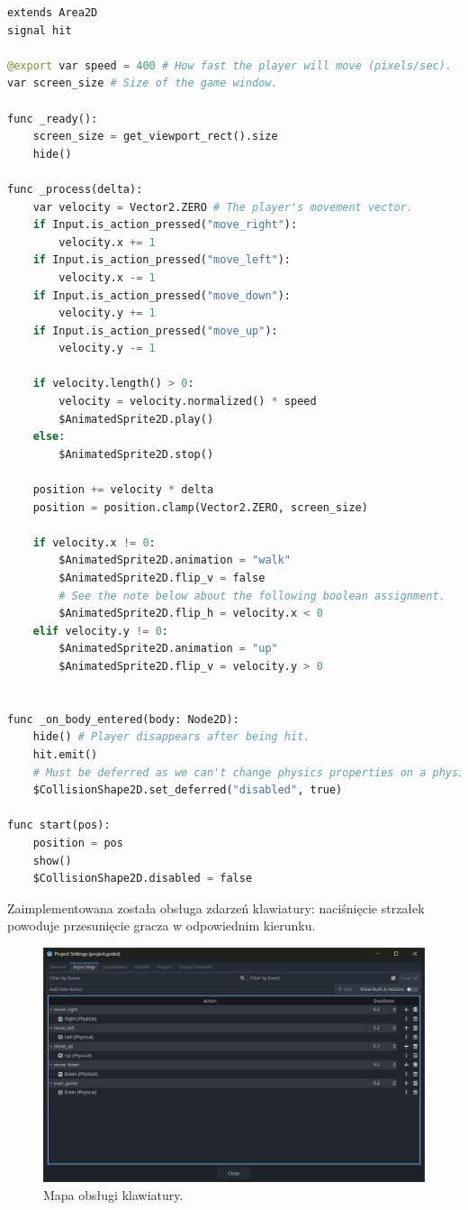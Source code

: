 \documentclass[a4paper,12pt]{article}
\begin{document}
\begin{lstlisting}[language=Python]
extends Area2D
signal hit

@export var speed = 400 # How fast the player will move (pixels/sec).
var screen_size # Size of the game window.

func _ready():
	screen_size = get_viewport_rect().size
	hide()
	
func _process(delta):
	var velocity = Vector2.ZERO # The player's movement vector.
	if Input.is_action_pressed("move_right"):
		velocity.x += 1
	if Input.is_action_pressed("move_left"):
		velocity.x -= 1
	if Input.is_action_pressed("move_down"):
		velocity.y += 1
	if Input.is_action_pressed("move_up"):
		velocity.y -= 1

	if velocity.length() > 0:
		velocity = velocity.normalized() * speed
		$AnimatedSprite2D.play()
	else:
		$AnimatedSprite2D.stop()
		
	position += velocity * delta
	position = position.clamp(Vector2.ZERO, screen_size)
	
	if velocity.x != 0:
		$AnimatedSprite2D.animation = "walk"
		$AnimatedSprite2D.flip_v = false
		# See the note below about the following boolean assignment.
		$AnimatedSprite2D.flip_h = velocity.x < 0
	elif velocity.y != 0:
		$AnimatedSprite2D.animation = "up"
		$AnimatedSprite2D.flip_v = velocity.y > 0


func _on_body_entered(body: Node2D):
	hide() # Player disappears after being hit.
	hit.emit()
	# Must be deferred as we can't change physics properties on a physics callback.
	$CollisionShape2D.set_deferred("disabled", true)
	
func start(pos):
	position = pos
	show()
	$CollisionShape2D.disabled = false

\end{lstlisting}

 Zaimplementowana została obsługa zdarzeń klawiatury: naciśnięcie strzałek powoduje przesunięcie gracza w odpowiednim kierunku.
 
\begin{figure}[h]
    \centering
    \includegraphics[width=1.0\textwidth]{Input_map.png}
    \caption{Mapa obsługi klawiatury.}
    \label{fig:player1_script}
\end{figure}
\end{document}
